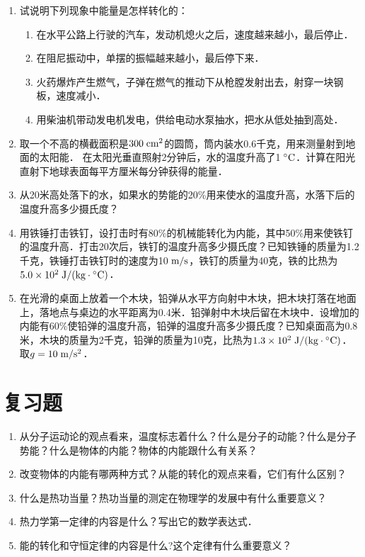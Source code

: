 \begin{enumerate}
\item 试说明下列现象中能量是怎样转化的：
\begin{enumerate}
    \item 在水平公路上行驶的汽车，发动机熄火之后，速度越来越小，最后停止．
    \item 在阻尼振动中，单摆的振幅越来越小，最后停下来．
    \item 火药爆炸产生燃气，子弹在燃气的推动下从枪膛发射出去，射穿一块钢板，速度减小．
    \item 用柴油机带动发电机发电，供给电动水泵抽水，把水从低处抽到高处．
\end{enumerate}

\item 取一个不高的横截面积是$ 300 \;\text{cm}^2 $的圆筒，筒内装水0.6千克，用来测量射到地面的太阳能．
在太阳光垂直照射2分钟后，水的温度升高了1$\;{}^\circ\text{C}$．计算在阳光直射下地球表面每平方厘米每分钟获得的能量．
\item 从20米高处落下的水，如果水的势能的20\%用来使水的温度升高，水落下后的温度升高多少摄氏度？
\item 用铁锤打击铁钉，设打击时有80\%的机械能转化为内能，其中50\%用来使铁钉的温度升高．打击20次后，铁钉的温度升高多少摄氏度？已知铁锤的质量为1.2千克，铁锤打击铁钉时的速度为10$\;\text{m}/\text{s}$，铁钉的质量为40克，铁的比热为$5.0\times 10^2  \;\text{J}/(\text{kg}\cdot{}^\circ\text{C}) $．

\item 在光滑的桌面上放着一个木块，铅弹从水平方向射中木块，把木块打落在地面上，落地点与桌边的水平距离为0.4米．铅弹射中木块后留在木块中．设增加的内能有60\%使铅弹的温度升高，铅弹的温度升高多少摄氏度？已知桌面高为0.8米，木块的质量为2千克，铅弹的质量为10克，比热为$1.3\times 10^2 \;\text{J}/(\text{kg}\cdot{}^\circ\text{C}) $．取$g=10 \;\text{m}/\text{s}^2 $．

\end{enumerate}

\section*{复习题}
\begin{enumerate}
\item 从分子运动论的观点看来，温度标志着什么？什么是分子的动能？什么是分子势能？什么是物体的内能？物体的内能跟什么有关系？
\item 改变物体的内能有哪两种方式？从能的转化的观点来看，它们有什么区别？
\item 什么是热功当量？热功当量的测定在物理学的发展中有什么重要意义？
\item 热力学第一定律的内容是什么？写出它的数学表达式．
\item 能的转化和守恒定律的内容是什么?这个定律有什么重要意义？
\end{enumerate}




